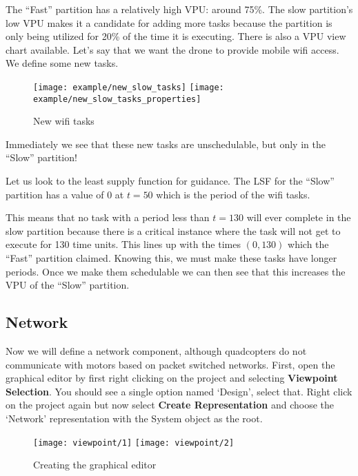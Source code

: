 The ``Fast'' partition has a relatively high VPU: around 75\%. The slow partition's
low VPU makes it a candidate for adding more tasks because the partition is only
being utilized for 20\% of the time it is executing. There is also a VPU view
chart available. Let's say that we want the drone to provide mobile wifi access.
We define some new tasks. 
\begin{figure}[H]
    \centering
    \texttt{[image: example/new\_slow\_tasks]}
    \texttt{[image: example/new\_slow\_tasks\_properties]}
    \caption{New wifi tasks}
\end{figure}

Immediately we see that these new tasks are unschedulable, but only in the 
``Slow'' partition! 

Let us look to the least supply function for guidance. 
The LSF for the ``Slow'' partition has a value of 0 at $t = 50$ which is
the period of the wifi tasks.

This means that no task with a period less than $t = 130$ will ever complete in the slow
partition because there is a critical instance where the task will not get to execute for
130 time units. This lines up with the times $(0,130)$ which the ``Fast'' partition
claimed. Knowing this, we must make these tasks have longer periods. Once we make them
schedulable we can then see that this increases the VPU of the ``Slow'' partition.

\subsection{Network}
Now we will define a network component, although quadcopters do not communicate with motors
based on packet switched networks. First, open the graphical editor by first right clicking 
on the project and selecting \textbf{Viewpoint Selection}. You should see a single option
named `Design', select that. Right click on the project again but now select \textbf{Create Representation}
and choose the `Network' representation with the System object as the root.
\begin{figure}[H]
\centering
    \texttt{[image: viewpoint/1]}
    \texttt{[image: viewpoint/2]}
\caption{Creating the graphical editor}
\end{figure}

